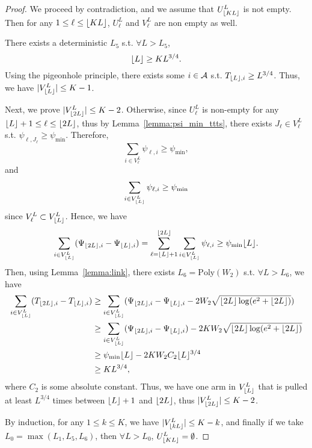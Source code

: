 \begin{proof}
    We proceed by contradiction, and we assume that $U_{\lfloor KL\rfloor}^L$ is not empty. Then for any $1 \leq \ell \leq \lfloor KL\rfloor$, $U_{\ell}^L$ and $V_{\ell}^L$ are non empty as well.
    
    There exists a deterministic $L_5$ s.t. $\forall L > L_5$,
    \[
        \lfloor L\rfloor \geq KL^{3/4}.
    \]
    Using the pigeonhole principle, there exists some $i \in \mathcal{A}$ s.t. $T_{\lfloor L\rfloor,i} \geq L^{3/4}$. Thus, we have $|V_{\lfloor L\rfloor}^L| \leq K-1$.
    
    Next, we prove $|V_{\lfloor2L\rfloor}^L| \leq K-2$. Otherwise, since $U_{\ell}^L$ is non-empty for any $\lfloor L\rfloor+1 \leq \ell \leq \lfloor2L\rfloor$, thus by Lemma~\ref{lemma:psi_min_ttts}, there exists $J_{\ell}\in V_\ell^L$ s.t. $\psi_{\ell,J_{\ell}} \geq \psi_{\min}$. Therefore,
    \[
        \sum_{i\in V_{\ell}^L} \psi_{\ell,i} \geq \psi_{\min},
    \]
    and
    \[
        \sum_{i\in V_{\lfloor L\rfloor}^L} \psi_{\ell,i} \geq \psi_{\min}
    \]
    since $V_{\ell}^L \subset V_{\lfloor L\rfloor}^L$. Hence, we have
    \[
        \sum_{i\in V_{\lfloor L\rfloor}^L} (\Psi_{\lfloor2L\rfloor,i} - \Psi_{\lfloor L\rfloor,i}) = \sum_{\ell = \lfloor L\rfloor+1}^{\lfloor2L\rfloor} \sum_{i\in V_{\lfloor L\rfloor}^L} \psi_{\ell,i} \geq \psi_{\min}\lfloor L\rfloor.
    \]
    Then, using Lemma~\ref{lemma:link}, there exists $L_6 = \text{Poly}(W_2)$ s.t. $\forall L > L_6$, we have
    \begin{align*}
        \sum_{i\in V_{\lfloor L\rfloor}^L} (T_{\lfloor2L\rfloor,i} - T_{\lfloor L\rfloor,i}) &\geq \sum_{i\in V_{\lfloor L\rfloor}^L} (\Psi_{\lfloor2L\rfloor,i} - \Psi_{\lfloor L\rfloor,i} - 2W_2\sqrt{\lfloor2L\rfloor\log(e^2+\lfloor2L\rfloor)})\\
                          &\geq 
        \sum_{i\in V_{\lfloor L\rfloor}^L} (\Psi_{\lfloor2L\rfloor,i} - \Psi_{\lfloor L\rfloor,i}) - 2KW_2\sqrt{\lfloor2L\rfloor\log(e^2+\lfloor2L\rfloor)}\\
                          &\geq \psi_{\min}\lfloor L\rfloor - 2KW_2C_2\lfloor L\rfloor^{3/4}\\
                          &\geq KL^{3/4},
    \end{align*}
    where $C_2$ is some absolute constant. Thus, we have one arm in $V_{\lfloor L\rfloor}^L$ that is pulled at least $L^{3/4}$ times between $\lfloor L\rfloor+1$ and $\lfloor2L\rfloor$, thus $|V_{\lfloor2L\rfloor}^L| \leq K-2$.
    
    By induction, for any $1 \leq k \leq K$, we have $|V_{\lfloor kL\rfloor}^L| \leq K-k$, and finally if we take $L_0=\max(L_1,L_5,L_6)$, then $\forall L > L_0$, $U_{\lfloor KL\rfloor}^L = \emptyset$.
\end{proof}

